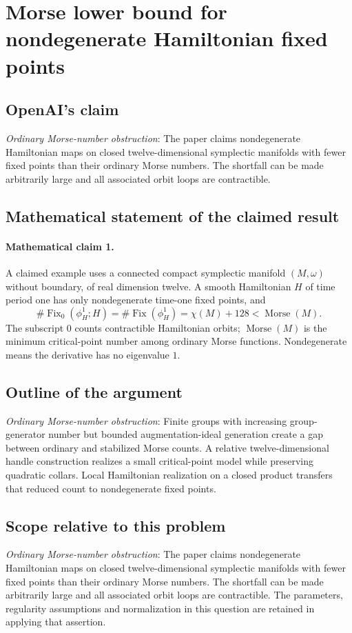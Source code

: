 \documentclass[11pt]{article}
\begin{document}
\section*{Morse lower bound for nondegenerate Hamiltonian fixed points}

\subsection{OpenAI's claim}
\textit{Ordinary Morse-number obstruction}: The paper claims nondegenerate Hamiltonian maps on closed twelve-dimensional symplectic manifolds with fewer fixed points than their ordinary Morse numbers. The shortfall can be made arbitrarily large and all associated orbit loops are contractible.

\subsection{Mathematical statement of the claimed result}
\paragraph{Mathematical claim 1.} A claimed example uses a connected compact symplectic manifold $(M,\omega)$ without boundary, of real dimension twelve. A smooth Hamiltonian $H$ of time period one has only nondegenerate time-one fixed points, and \[\#\operatorname{Fix}_0(\phi_H^1;H)=\#\operatorname{Fix}(\phi_H^1)=\chi(M)+128<\operatorname{Morse}(M).\] The subscript $0$ counts contractible Hamiltonian orbits; $\operatorname{Morse}(M)$ is the minimum critical-point number among ordinary Morse functions. Nondegenerate means the derivative has no eigenvalue $1$.

\subsection{Outline of the argument}
\textit{Ordinary Morse-number obstruction}: Finite groups with increasing group-generator number but bounded augmentation-ideal generation create a gap between ordinary and stabilized Morse counts. A relative twelve-dimensional handle construction realizes a small critical-point model while preserving quadratic collars. Local Hamiltonian realization on a closed product transfers that reduced count to nondegenerate fixed points.

\subsection{Scope relative to this problem}
\textit{Ordinary Morse-number obstruction}: The paper claims nondegenerate Hamiltonian maps on closed twelve-dimensional symplectic manifolds with fewer fixed points than their ordinary Morse numbers. The shortfall can be made arbitrarily large and all associated orbit loops are contractible. The parameters, regularity assumptions and normalization in this question are retained in applying that assertion.
\end{document}
